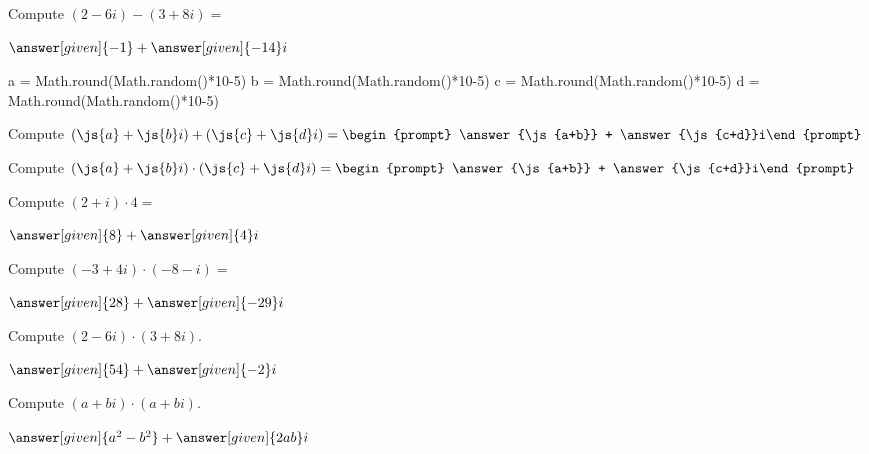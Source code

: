 \documentclass[nooutcomes]{ximera}
\begin{document}
\begin{problem}
Compute $(2-6i) - (3+8i) =$ 
\begin{prompt}
	$\answer[given]{-1} + \answer[given]{-14}i$
\end{prompt}
\end{problem}

\begin{javascript}
  a = Math.round(Math.random()*10-5)
  b = Math.round(Math.random()*10-5)
  c = Math.round(Math.random()*10-5)
  d = Math.round(Math.random()*10-5)
\end{javascript}

\begin{problem}
Compute $(\js{a}+\js{b}i)+(\js{c}+\js{d}i) = \begin{prompt} \answer{\js{a+b}} + \answer{\js{c+d}}i\end{prompt}$
\end{problem}

\begin{problem}
Compute $(\js{a}+\js{b}i)\cdot(\js{c}+\js{d}i) = \begin{prompt} \answer{\js{a+b}} + \answer{\js{c+d}}i\end{prompt}$
\end{problem}


\begin{problem}
Compute $(2+i) \cdot 4 =$
\begin{prompt}
	$\answer[given]{8} + \answer[given]{4}i$
\end{prompt}
\end{problem}



\begin{problem}
Compute $(-3 + 4i) \cdot (-8 - i) =$
\begin{prompt}
	$\answer[given]{28} + \answer[given]{-29}i$
\end{prompt}
\end{problem}




\begin{problem}
Compute $(2-6i) \cdot (3+8i)$.
\begin{prompt}
	$\answer[given]{54} + \answer[given]{-2}i$
\end{prompt}
\end{problem}


\begin{problem}
Compute $(a+bi) \cdot (a+bi)$.
\begin{prompt}
	$\answer[given]{a^2-b^2} + \answer[given]{2ab}i$
\end{prompt}
\end{problem}
\end{document}
